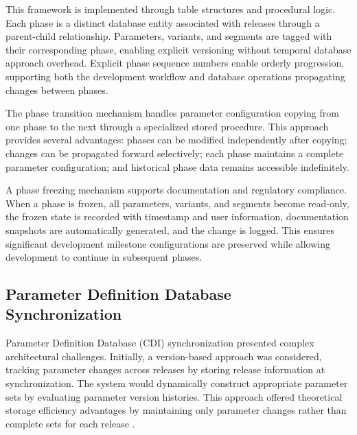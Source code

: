 This framework is implemented through table structures and procedural logic. Each phase is a distinct database entity associated with releases through a parent-child relationship. Parameters, variants, and segments are tagged with their corresponding phase, enabling explicit versioning without temporal database approach overhead. Explicit phase sequence numbers enable orderly progression, supporting both the development workflow and database operations propagating changes between phases.

The phase transition mechanism handles parameter configuration copying from one phase to the next through a specialized stored procedure. This approach provides several advantages: phases can be modified independently after copying; changes can be propagated forward selectively; each phase maintains a complete parameter configuration; and historical phase data remains accessible indefinitely.

A phase freezing mechanism supports documentation and regulatory compliance. When a phase is frozen, all parameters, variants, and segments become read-only, the frozen state is recorded with timestamp and user information, documentation snapshots are automatically generated, and the change is logged. This ensures significant development milestone configurations are preserved while allowing development to continue in subsequent phases.

\subsection{Parameter Definition Database Synchronization}
\label{subsec:parameter-db-sync}

Parameter Definition Database (CDI) synchronization presented complex architectural challenges. Initially, a version-based approach was considered, tracking parameter changes across releases by storing release information at synchronization. The system would dynamically construct appropriate parameter sets by evaluating parameter version histories. This approach offered theoretical storage efficiency advantages by maintaining only parameter changes rather than complete sets for each release \cite{bhattacherjee2015principles}.

